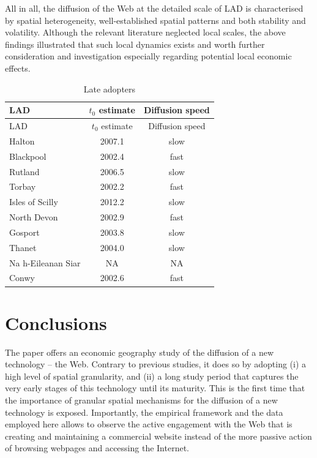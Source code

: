 \documentclass[
  authoryear,
  preprint,
  3p]{elsarticle}
\begin{document}
All in all, the diffusion of the Web at the detailed scale of LAD is
characterised by spatial heterogeneity, well-established spatial
patterns and both stability and volatility. Although the relevant
literature neglected local scales, the above findings illustrated that
such local dynamics exists and worth further consideration and
investigation especially regarding potential local economic effects.

\begin{longtable}[]{@{}lcc@{}}
\caption{Late adopters\label{table.late}}\tabularnewline
\toprule\noalign{}
LAD & \(t_{0}\) estimate & Diffusion speed \\
\midrule\noalign{}
\endfirsthead
\toprule\noalign{}
LAD & \(t_{0}\) estimate & Diffusion speed \\
\midrule\noalign{}
\endhead
\bottomrule\noalign{}
\endlastfoot
Halton & 2007.1 & slow \\
Blackpool & 2002.4 & fast \\
Rutland & 2006.5 & slow \\
Torbay & 2002.2 & fast \\
Isles of Scilly & 2012.2 & slow \\
North Devon & 2002.9 & fast \\
Gosport & 2003.8 & slow \\
Thanet & 2004.0 & slow \\
Na h-Eileanan Siar & NA & NA \\
Conwy & 2002.6 & fast \\
\end{longtable}

\section{Conclusions}\label{sec-conclusions}

The paper offers an economic geography study of the diffusion of a new
technology -- the Web. Contrary to previous studies, it does so by
adopting (i) a high level of spatial granularity, and (ii) a long study
period that captures the very early stages of this technology until its
maturity. This is the first time that the importance of granular spatial
mechanisms for the diffusion of a new technology is exposed.
Importantly, the empirical framework and the data employed here allows
to observe the active engagement with the Web that is creating and
maintaining a commercial website instead of the more passive action of
browsing webpages and accessing the Internet.
\end{document}
